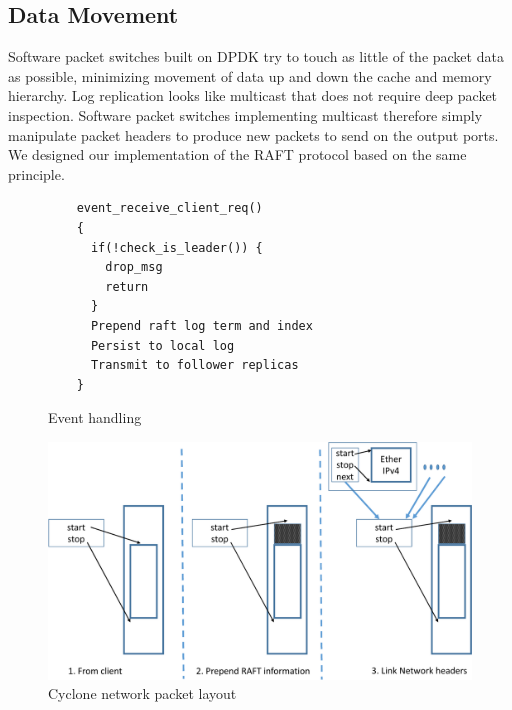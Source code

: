 \documentclass[pageno]{jpaper}
\begin{document}
\subsection{Data Movement}
\label{sec:dm}
Software packet switches built on DPDK try to touch as little of the packet data
as possible, minimizing movement of data up and down the cache and memory
hierarchy. Log replication looks like multicast that does not require deep
packet inspection. Software packet switches implementing multicast therefore
simply manipulate packet headers to produce new packets to send on the output
ports. We designed our implementation of the RAFT protocol based on the same
principle.

\begin{figure}
  \begin{minipage}{.2\textwidth}
    \scriptsize
\begin{verbatim}
    event_receive_client_req()
    {
      if(!check_is_leader()) {
        drop_msg
        return
      }
      Prepend raft log term and index
      Persist to local log
      Transmit to follower replicas
    }
\end{verbatim}
\caption{Event handling}
\label{fig:control_plane}
\end{minipage}
\begin{minipage}{.5\textwidth}
  \centering
  \includegraphics[scale=0.3]{figures2/network_packet.pdf}
  \caption{Cyclone network packet layout}
  \label{fig:packet_layout}
\end{minipage}
\begin{minipage}{.3\textwidth}
  \centering

\end{minipage}
\end{figure}
\end{document}
